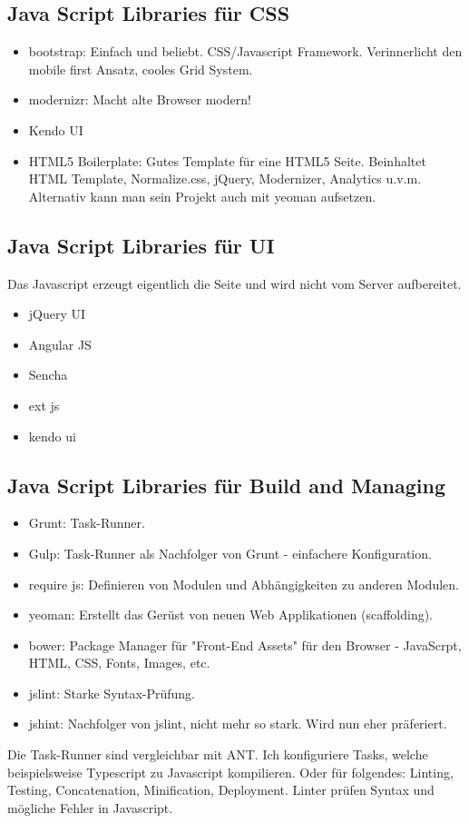 \subsection{Java Script Libraries für CSS}
\begin{itemize}
	\item bootstrap: Einfach und beliebt. CSS/Javascript Framework. Verinnerlicht den mobile first Ansatz, cooles Grid System.
	\item modernizr: Macht alte Browser modern!
	\item Kendo UI
	\item HTML5 Boilerplate: Gutes Template für eine HTML5 Seite. Beinhaltet HTML Template, Normalize.css, jQuery, Modernizer, Analytics u.v.m. Alternativ kann man sein Projekt auch mit yeoman aufsetzen.
\end{itemize}

\newpage

\subsection{Java Script Libraries für UI}
Das Javascript erzeugt eigentlich die Seite und wird nicht vom Server aufbereitet.
\begin{itemize}
	\item jQuery UI
	\item Angular JS
	\item Sencha
	\item ext js
	\item kendo ui
\end{itemize}

\subsection{Java Script Libraries für Build and Managing}
\begin{itemize}
	\item Grunt: Task-Runner.
	\item Gulp: Task-Runner als Nachfolger von Grunt - einfachere Konfiguration.
	\item require js: Definieren von Modulen und Abhängigkeiten zu anderen Modulen.
	\item yeoman: Erstellt das Gerüst von neuen Web Applikationen (scaffolding).
	\item bower: Package Manager für "Front-End Assets" für den Browser - JavaScrpt, HTML, CSS, Fonts, Images, etc. 
	\item jslint: Starke Syntax-Prüfung.
	\item jshint: Nachfolger von jslint, nicht mehr so stark. Wird nun eher präferiert.
\end{itemize}
Die Task-Runner sind vergleichbar mit ANT. Ich konfiguriere Tasks, welche beispielsweise Typescript zu Javascript kompilieren. Oder für folgendes: Linting, Testing, Concatenation,
Minification, Deployment. Linter prüfen Syntax und mögliche Fehler in Javascript.


